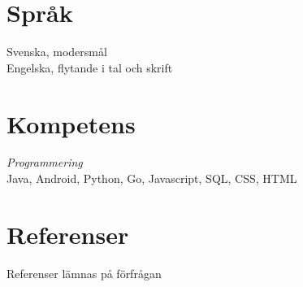 \documentclass[margin, 10pt]{res} %
\begin{document}
\begin{resume}

\section{Språk}
Svenska, modersmål \\
Engelska, flytande i tal och skrift


\section{Kompetens}
{\sl Programmering} \\
Java, Android, Python, Go, Javascript, SQL, CSS, HTML



\section{Referenser}
Referenser lämnas på förfrågan


\end{resume}
\end{document}
